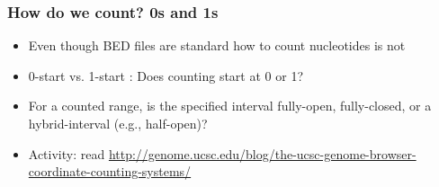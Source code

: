 \documentclass{beamer}
\begin{document}













\begin{frame}
  \frametitle{How do we count? 0s and 1s}
  \begin{itemize}
  \item Even though BED files are standard how to count nucleotides is not
  \item 0-start vs. 1-start : Does counting start at 0 or 1?
  \item For a counted range, is the specified interval fully-open, fully-closed, or a hybrid-interval (e.g., half-open)? 
  \item Activity: read \url{http://genome.ucsc.edu/blog/the-ucsc-genome-browser-coordinate-counting-systems/}
  \end{itemize}
\end{frame}
\end{document}
